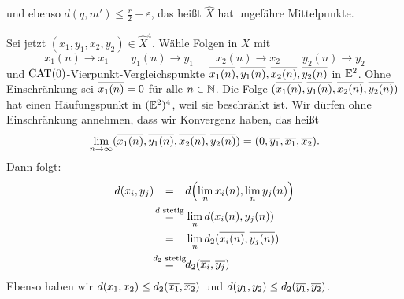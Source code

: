 \begin{beweis}
	und ebenso $d(q,m') \leq \frac{r}{2} + \varepsilon$, das heißt $\widehat{X}$ hat ungefähre Mittelpunkte.
	
	Sei jetzt $(x_1,y_1,x_2,y_2) \in \widehat{X}^4$. Wähle Folgen in $X$ mit
	\[
		x_1(n) \rightarrow x_1 \qquad y_1(n) \rightarrow y_1 \qquad x_2(n) \rightarrow x_2 \qquad y_2(n) \rightarrow y_2
	\]
	und $\operatorname{CAT(0)}$-Vierpunkt-Vergleichspunkte $\overline{x_1(n)}, \overline{y_1(n)}, \overline{x_2(n)}, \overline{y_2(n)}$ in $\mathbb{E}^2$. Ohne Einschränkung sei $\overline{x_1(n)} = 0$ für alle $n \in \mathbb{N}$. Die Folge $(\overline{x_1(n)}, \overline{y_1(n)}, \overline{x_2(n)}, \overline{y_2(n)})$ hat einen Häufungspunkt in $(\mathbb{E}^2)^4$, weil sie beschränkt ist. Wir dürfen ohne Einschränkung annehmen, dass wir Konvergenz haben, das heißt
	\[
		\lim\limits_{n \rightarrow \infty} (\overline{x_1(n)}, \overline{y_1(n)}, \overline{x_2(n)}, \overline{y_2(n)}) = (0,\overline{y_1},\overline{x_1},\overline{x_2}).
	\]
	Dann folgt:
	\begin{align*}
		d(x_i,y_j) &\stack{}{=} d\enbrace*{\lim\limits_{n} x_i(n), \lim\limits_n y_j(n)} \\
		&\stack{d\text{ stetig}}{=} \lim\limits_{n} d(x_i(n),y_j(n)) \\
		&\stack{}{=} \lim\limits_{n} d_2(\ol{x_i(n)},\ol{y_j(n)}) \\
		&\stack{d_2\text{ stetig}}{=} d_2(\ol{x_i},\ol{y_j})
	\end{align*}
	Ebenso haben wir $d(x_1,x_2) \leq d_2(\overline{x_1},\overline{x_2})$ und $d(y_1,y_2) \leq d_2(\overline{y_1},\overline{y_2})$. \qedhere
\end{beweis}
\cleardoubleoddemptypage